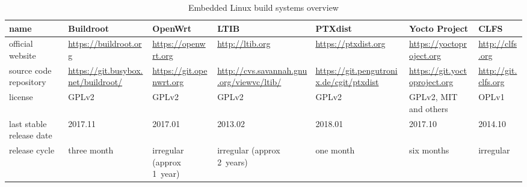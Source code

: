 \documentclass[printmode]{mgr}
\begin{document}
\begin{table}
  \begin{tabular}{| p{2cm} | p{2cm} | p{2cm} | p{2cm} | p{2cm} | p{2cm} | p{2cm} |}
    \hline
    name & Buildroot & OpenWrt & LTIB & PTXdist & Yocto Project & CLFS \\
    \hline
    official website & \url{https://buildroot.org} & \url{https://openwrt.org} & \url{http://ltib.org} & \url{https://ptxdist.org} & \url{https://yoctoproject.org} & \url{http://clfs.org}\\
    \hline
    source code repository & \url{https://git.busybox.net/buildroot/} & \url{https://git.openwrt.org} & \url{http://cvs.savannah.gnu.org/viewvc/ltib/} & \url{https://git.pengutronix.de/cgit/ptxdist} & \url{https://git.yoctoproject.org} & \url{http://git.clfs.org} \\
    \hline
    license & GPLv2\cite{web:buildroot-license} & GPLv2\cite{web:openwrt-license} & GPLv2\cite{web:ltib-license} & GPLv2\cite{web:ptxdist-license} & GPLv2, MIT and others\cite{web:yoctoproject-license} & OPLv1\cite{web:clfs-license} \\
    \hline
    last stable release date & 2017.11 & 2017.01 & 2013.02 & 2018.01 & 2017.10 & 2014.10\\
    \hline
    release cycle & three month\cite{web:buildroot-releases} & irregular (approx 1~year) & irregular (approx 2~years)\cite{web:ltib-releases} & one month\cite{web:ptxdist-releases} & six months\cite{web:yoctoproject-releases} & irregular\cite{web:clfs-releases}\\
    \hline
  \end{tabular}
  \caption{Embedded Linux build systems overview}
\end{table}







\end{document}
